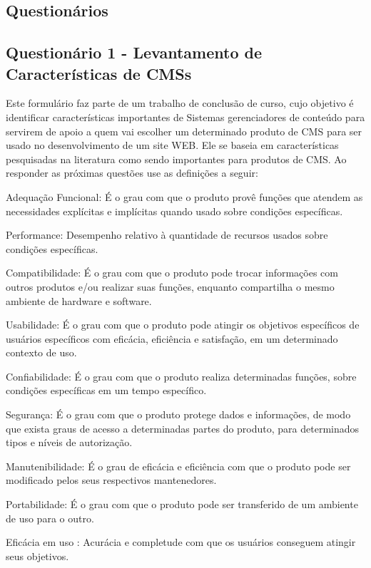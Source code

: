 \begin{apendicesenv}
\chapter{Questionários}
\label{Questionários}

\section{Questionário 1 - Levantamento de Características de CMSs}
\label{Quest1}

Este formulário faz parte de um trabalho de conclusão de curso, cujo objetivo é identificar características importantes de Sistemas gerenciadores de conteúdo para servirem de apoio a quem vai escolher um determinado produto de CMS para ser usado no desenvolvimento de um site WEB. 
Ele se baseia em características pesquisadas na literatura como sendo importantes para produtos de CMS. Ao responder as próximas questões use as definições a seguir:

Adequação Funcional: É o grau com que o produto provê funções que atendem as necessidades explícitas e implícitas quando usado sobre condições específicas.

Performance: Desempenho relativo à quantidade de recursos usados sobre condições específicas.

Compatibilidade: É o grau com que o produto pode trocar informações com outros produtos e/ou realizar suas funções, enquanto compartilha o mesmo ambiente de hardware e software.

Usabilidade: É o grau com que o produto pode atingir os objetivos específicos de usuários específicos com eficácia, eficiência e satisfação, em um determinado contexto de uso.

Confiabilidade: É o grau com que o produto realiza determinadas funções, sobre condições específicas em um tempo específico.

Segurança: É o grau com que o produto protege dados e informações, de modo que exista graus de acesso a determinadas partes do produto, para determinados tipos e níveis de autorização.

Manutenibilidade: É o grau de eficácia e eficiência com que o produto pode ser modificado pelos seus respectivos mantenedores.

Portabilidade: É o grau com que o produto pode ser transferido de um ambiente de uso para o outro.

Eficácia em uso : Acurácia e completude com que os usuários conseguem atingir seus objetivos.


\end{apendicesenv}
